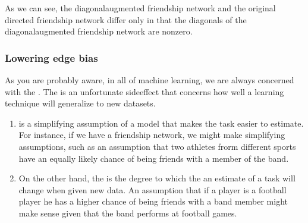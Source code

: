 \documentclass[letterpaper,10pt,english]{jupyterBook}
\begin{document}
\noindent{}

\sphinxAtStartPar
As we can see, the diagonal\sphinxhyphen{}augmented friendship network and the original directed friendship network differ only in that the diagonals of the diagonal\sphinxhyphen{}augmented friendship network are non\sphinxhyphen{}zero.


\subsubsection{Lowering edge bias}
\label{\detokenize{representations/ch4/regularization:lowering-edge-bias}}
\sphinxAtStartPar
As you are probably aware, in all of machine learning, we are always concerned with the . The  is an unfortunate side\sphinxhyphen{}effect that concerns how well a learning technique will generalize to new datasets.
\begin{enumerate}
%
\item {} 
\sphinxAtStartPar
{} is a simplifying assumption of a model that makes the task easier to estimate. For instance, if we have a friendship network, we might make simplifying assumptions, such as an assumption that two athletes frorm different sports have an equally likely chance of being friends with a member of the band.

\item {} 
\sphinxAtStartPar
On the other hand, the  is the degree to which the an estimate of a task will change when given new data. An assumption that if a player is a football player he has a higher chance of being friends with a band member might make sense given that the band performs at football games.

\end{enumerate}
\end{document}
